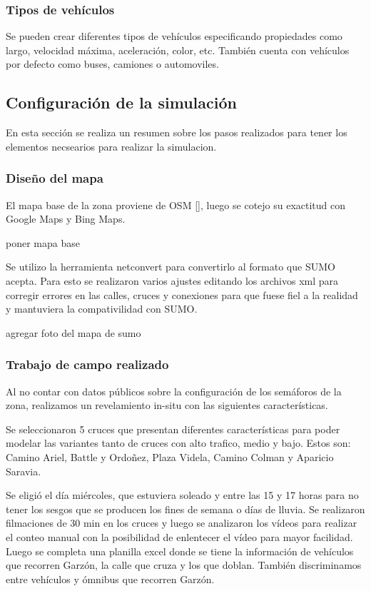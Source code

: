 \subsubsection{Tipos de vehículos}
Se pueden crear diferentes tipos de vehículos especificando propiedades como largo, velocidad máxima,  aceleración, color, etc. También cuenta con vehículos por defecto como buses, camiones o automoviles.







\subsection{Configuración de la simulación}

En esta sección se realiza un resumen sobre los pasos realizados para tener los elementos necsearios para realizar la simulacion.

\subsubsection{Diseño del mapa}


El mapa base de la zona proviene de OSM [], luego se cotejo su exactitud con Google Maps y Bing Maps.

poner mapa base

Se utilizo la herramienta netconvert para convertirlo al formato que SUMO acepta. 
Para esto se realizaron varios ajustes editando los archivos xml para corregir errores en las calles, cruces y conexiones para que fuese fiel a la realidad y mantuviera la compativilidad con SUMO.


agregar foto del mapa de sumo


\subsubsection{Trabajo de campo realizado}
Al no contar con datos públicos sobre la configuración de los semáforos de la zona, realizamos un revelamiento in-situ con las siguientes características.

Se seleccionaron 5 cruces que presentan diferentes características para poder modelar las variantes tanto de cruces con alto trafico, medio y bajo. 
Estos son: Camino Ariel, Battle y Ordoñez, Plaza Videla, Camino Colman y Aparicio Saravia.

Se eligió el día miércoles, que estuviera soleado y entre las 15 y 17 horas para no tener los sesgos que se producen los fines de semana o días de lluvia.
Se realizaron filmaciones de 30 min en los cruces y luego se analizaron los vídeos para realizar el conteo manual con la posibilidad de enlentecer el vídeo para mayor facilidad. Luego se completa una planilla excel donde se tiene la información de vehículos que recorren Garzón, la calle que cruza y los que doblan. También discriminamos entre vehículos y ómnibus que recorren Garzón.

